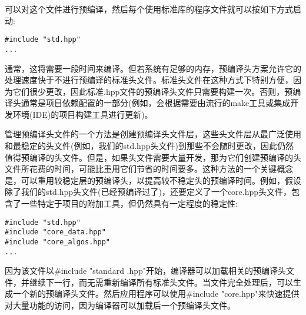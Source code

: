 可以对这个文件进行预编译，然后每个使用标准库的程序文件就可以按如下方式启动:

\begin{lstlisting}[style=styleCXX]
#include "std.hpp"
...
\end{lstlisting}

通常，这将需要一段时间来编译。但若系统有足够的内存，预编译头方案允许它的处理速度快于不进行预编译的标准头文件。标准头文件在这种方式下特别方便，因为它们很少更改，因此标准.hpp文件的预编译头文件只需要构建一次。否则，预编译头通常是项目依赖配置的一部分(例如，会根据需要由流行的make工具或集成开发环境(IDE)的项目构建工具进行更新)。

管理预编译头文件的一个方法是创建预编译头文件层，这些头文件层从最广泛使用和最稳定的头文件(例如，我们的std.hpp头文件)到那些不会随时更改，因此仍然值得预编译的头文件。但是，如果头文件需要大量开发，那为它们创建预编译的头文件所花费的时间，可能比重用它们节省的时间要多。这种方法的一个关键概念是，可以重用较稳定层的预编译头，以提高较不稳定头的预编译时间。例如，假设除了我们的std.hpp头文件(已经预编译过了)，还要定义了一个core.hpp头文件，包含了一些特定于项目的附加工具，但仍然具有一定程度的稳定性:

\begin{lstlisting}[style=styleCXX]
#include "std.hpp"
#include "core_data.hpp"
#include "core_algos.hpp"
...
\end{lstlisting}

因为该文件以\#include "standard .hpp"开始，编译器可以加载相关的预编译头文件，并继续下一行，而无需重新编译所有标准头文件。当文件完全处理后，可以生成一个新的预编译头文件。然后应用程序可以使用\#include "core.hpp"来快速提供对大量功能的访问，因为编译器可以加载后一个预编译头文件。
























